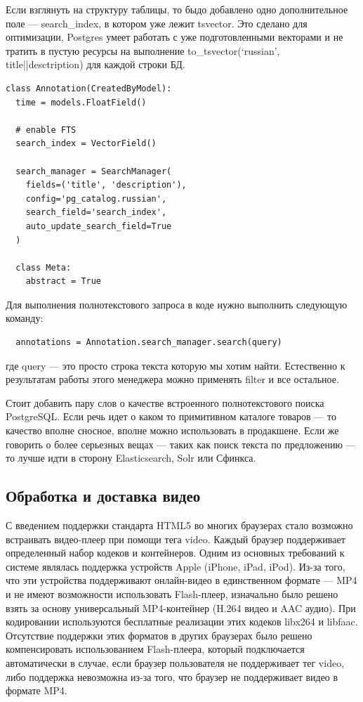 Если взглянуть на структуру таблицы, то быдо добавлено одно дополнительное поле — search\_index,
в котором уже лежит tsvector. Это сделано для оптимизации, Postgres умеет работать с уже подготовленными векторами
и не тратить в пустую ресурсы на выполнение to\_tsvector(‘russian’, title||desctription) для каждой строки БД.

\FloatBarrier

\begin{lstlisting}[caption={Изменения в модели аннотации для возможности поиска}, label=lst:annotation]
class Annotation(CreatedByModel):
  time = models.FloatField()

  # enable FTS
  search_index = VectorField()

  search_manager = SearchManager(
    fields=('title', 'description'),
    config='pg_catalog.russian',
    search_field='search_index',
    auto_update_search_field=True
  )

  class Meta:
    abstract = True
\end{lstlisting}

\FloatBarrier

Для выполнения полнотекстового запроса в коде нужно выполнить следующую команду:
\begin{verbatim}
  annotations = Annotation.search_manager.search(query)
\end{verbatim}

где query — это просто строка текста которую мы хотим найти. Естественно к результатам работы этого менеджера
можно применять filter и все остальное.

Стоит добавить пару слов о качестве встроенного полнотекстового поиска PostgreSQL.
Если речь идет о каком то примитивном каталоге товаров — то качество вполне сносное, вполне можно использовать в продакшене.
Если же говорить о более серьезных вещах — таких как поиск текста по предложению — то лучше идти в сторону Elasticsearch, Solr
или Сфинкса.

\subsection{Обработка и доставка видео}

С введением поддержки стандарта HTML5 во многих браузерах стало возможно встраивать видео-плеер при помощи тега video.
Каждый браузер поддерживает определенный набор кодеков и контейнеров. Одним из основных требований к системе являлась
поддержка устройств Apple (iPhone, iPad, iPod). Из-за того, что эти устройства поддерживают онлайн-видео
в единственном формате — MP4 и не имеют возможности использовать Flash-плеер, изначально было решено взять за
основу универсальный MP4-контейнер (H.264 видео и AAC аудио). При кодировании используются бесплатные реализации этих
кодеков libx264 и libfaac. Отсутствие поддержки этих форматов в других браузерах было решено компенсировать
использованием Flash-плеера, который подключается автоматически в случае, если браузер пользователя не поддерживает
тег video, либо поддержка невозможна из-за того, что браузер не поддерживает видео в формате MP4.

